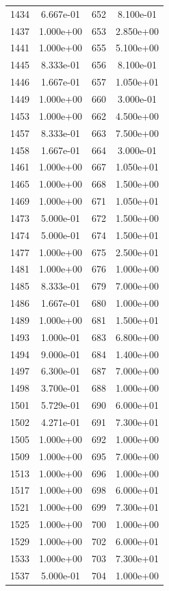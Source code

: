 \documentclass[12pt]{article}
\begin{document}
\begin{longtable}{@{}cccc@{}}
1434 & 6.667e-01 & 652 & 8.100e-01 \\
1437 & 1.000e+00 & 653 & 2.850e+00 \\
1441 & 1.000e+00 & 655 & 5.100e+00 \\
1445 & 8.333e-01 & 656 & 8.100e-01 \\
1446 & 1.667e-01 & 657 & 1.050e+01 \\
1449 & 1.000e+00 & 660 & 3.000e-01 \\
1453 & 1.000e+00 & 662 & 4.500e+00 \\
1457 & 8.333e-01 & 663 & 7.500e+00 \\
1458 & 1.667e-01 & 664 & 3.000e-01 \\
1461 & 1.000e+00 & 667 & 1.050e+01 \\
1465 & 1.000e+00 & 668 & 1.500e+00 \\
1469 & 1.000e+00 & 671 & 1.050e+01 \\
1473 & 5.000e-01 & 672 & 1.500e+00 \\
1474 & 5.000e-01 & 674 & 1.500e+01 \\
1477 & 1.000e+00 & 675 & 2.500e+01 \\
1481 & 1.000e+00 & 676 & 1.000e+00 \\
1485 & 8.333e-01 & 679 & 7.000e+00 \\
1486 & 1.667e-01 & 680 & 1.000e+00 \\
1489 & 1.000e+00 & 681 & 1.500e+01 \\
1493 & 1.000e-01 & 683 & 6.800e+00 \\
1494 & 9.000e-01 & 684 & 1.400e+00 \\
1497 & 6.300e-01 & 687 & 7.000e+00 \\
1498 & 3.700e-01 & 688 & 1.000e+00 \\
1501 & 5.729e-01 & 690 & 6.000e+01 \\
1502 & 4.271e-01 & 691 & 7.300e+01 \\
1505 & 1.000e+00 & 692 & 1.000e+00 \\
1509 & 1.000e+00 & 695 & 7.000e+00 \\
1513 & 1.000e+00 & 696 & 1.000e+00 \\
1517 & 1.000e+00 & 698 & 6.000e+01 \\
1521 & 1.000e+00 & 699 & 7.300e+01 \\
1525 & 1.000e+00 & 700 & 1.000e+00 \\
1529 & 1.000e+00 & 702 & 6.000e+01 \\
1533 & 1.000e+00 & 703 & 7.300e+01 \\
1537 & 5.000e-01 & 704 & 1.000e+00 \\

\end{longtable}
\end{document}
